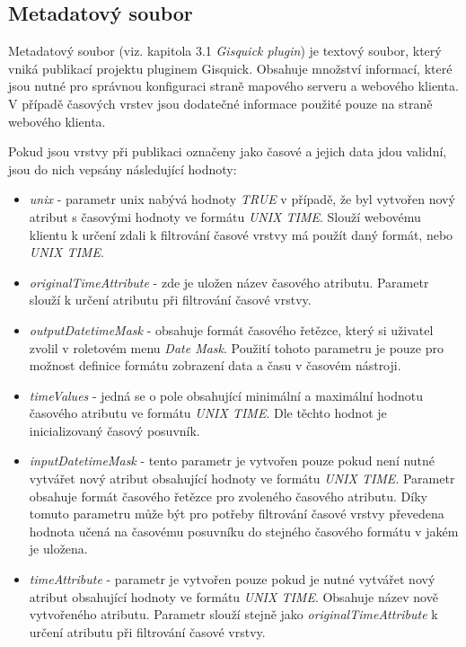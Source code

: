 
\subsection{Metadatový soubor}

Metadatový soubor (viz. kapitola 3.1 \textit{Gisquick plugin}) je
textový soubor, který vniká publikací projektu pluginem
Gisquick. Obsahuje množství informací, které jsou nutné pro správnou
konfiguraci straně mapového serveru a webového klienta. V případě
časových vrstev jsou dodatečné informace použité pouze na straně
webového klienta.

Pokud jsou vrstvy při publikaci označeny jako časové a jejich data
jdou validní, jsou do nich vepsány následující hodnoty:

\begin{itemize}
	\item\textit{unix} - parametr unix nabývá
	hodnoty \textit{TRUE} v případě, že byl vytvořen nový atribut
	s časovými hodnoty ve formátu \textit{UNIX TIME}. Slouží
	webovému klientu k určení zdali k filtrování časové vrstvy má
	použít daný formát, nebo \textit{UNIX
	TIME}.  \item\textit{originalTimeAttribute} - zde je uložen
	název časového atributu. Parametr slouží k určení atributu při
	filtrování časové vrstvy.  \item\textit{outputDatetimeMask} -
	obsahuje formát časového řetězce, který si uživatel zvolil v
	roletovém menu \textit{Date Mask}. Použití tohoto parametru je
	pouze pro možnost definice formátu zobrazení data a času v
	časovém nástroji.  \item\textit{timeValues} - jedná se o pole
	obsahující minimální a maximální hodnotu časového atributu ve
	formátu \textit{UNIX TIME}. Dle těchto hodnot je
	inicializovaný časový
	posuvník.  \item\textit{inputDatetimeMask} - tento parametr je
	vytvořen pouze pokud není nutné vytvářet nový atribut
	obsahující hodnoty ve formátu \textit{UNIX TIME}. Parametr
	obsahuje formát časového řetězce pro zvoleného časového
	atributu. Díky tomuto parametru může být pro potřeby
	filtrování časové vrstvy převedena hodnota učená na časovému
	posuvníku do stejného časového formátu v jakém je
	uložena.  \item\textit{timeAttribute} - parametr je vytvořen
	pouze pokud je nutné vytvářet nový atribut obsahující hodnoty
	ve formátu \textit{UNIX TIME}. Obsahuje název nově vytvořeného
	atributu. Parametr slouží stejně
	jako \textit{originalTimeAttribute} k určení atributu při
	filtrování časové vrstvy.
\end{itemize}

